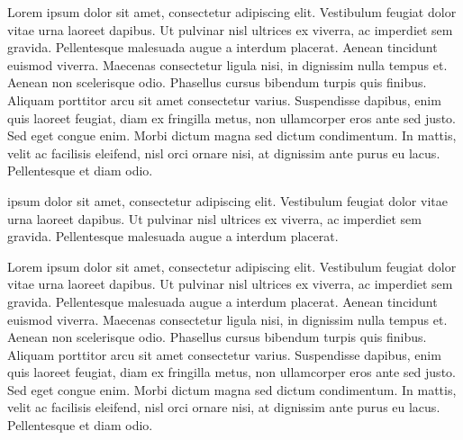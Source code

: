 \documentclass{article}
\begin{document}
\begin{pairs}


\begin{Leftside}
\resumenumbering
\pstart

Lorem ipsum dolor sit amet, consectetur adipiscing elit. Vestibulum feugiat dolor vitae urna laoreet dapibus. Ut pulvinar nisl ultrices ex viverra, ac imperdiet sem gravida. Pellentesque malesuada augue a interdum placerat. Aenean tincidunt euismod viverra. Maecenas consectetur ligula nisi, in dignissim nulla tempus et. Aenean non scelerisque odio. Phasellus cursus bibendum turpis quis finibus. Aliquam porttitor arcu sit amet consectetur varius. Suspendisse dapibus, enim quis laoreet feugiat, diam ex fringilla metus, non ullamcorper eros ante sed justo. Sed eget congue enim. Morbi dictum magna sed dictum condimentum. In mattis, velit ac facilisis eleifend, nisl orci ornare nisi, at dignissim ante purus eu lacus. Pellentesque et diam odio.
\pend
\pausenumbering
\end{Leftside}

\begin{Rightside}
\resumenumbering
\pstart
{} ipsum dolor sit amet, consectetur adipiscing elit. Vestibulum feugiat dolor vitae urna laoreet dapibus. Ut pulvinar nisl ultrices ex viverra, ac imperdiet sem gravida. Pellentesque malesuada augue a interdum placerat.
\pend
\pausenumbering
\end{Rightside}
\end{pairs}
\Columns

\resumenumbering
\pstart
Lorem ipsum dolor sit amet, consectetur adipiscing elit. Vestibulum feugiat dolor vitae urna laoreet dapibus. Ut pulvinar nisl ultrices ex viverra, ac imperdiet sem gravida. Pellentesque malesuada augue a interdum placerat. Aenean tincidunt euismod viverra. Maecenas consectetur ligula nisi, in dignissim nulla tempus et. Aenean non scelerisque odio. Phasellus cursus bibendum turpis quis finibus. Aliquam porttitor arcu sit amet consectetur varius. Suspendisse dapibus, enim quis laoreet feugiat, diam ex fringilla metus, non ullamcorper eros ante sed justo. Sed eget congue enim. Morbi dictum magna sed dictum condimentum. In mattis, velit ac facilisis eleifend, nisl orci ornare nisi, at dignissim ante purus eu lacus. Pellentesque et diam odio.
\pend
\pausenumbering
\end{document}
